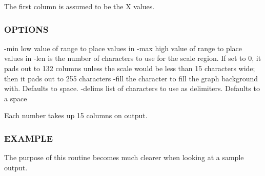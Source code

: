 The first column is assumed to be the X values.

\subsubsection*{O\+P\+T\+I\+O\+NS}

-\/min low value of range to place values in -\/max high value of range to place values in -\/len is the number of characters to use for the scale region. If set to 0, it pads out to 132 columns unless the scale would be less than 15 characters wide; then it pads out to 255 characters -\/fill the character to fill the graph background with. Defaults to space. -\/delims list of characters to use as delimiters. Defaults to a space

Each number takes up 15 columns on output.

\subsubsection*{E\+X\+A\+M\+P\+LE}

The purpose of this routine becomes much clearer when looking at a sample output.

